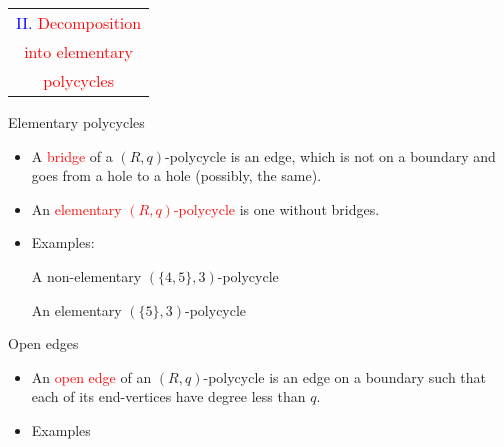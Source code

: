 \documentclass[%
pdf,
colorBG,
slideColor,
]{prosper}
\begin{document}
\begin{slide}{}
\begin{center}
{\Huge 
\begin{tabular*}{8cm}{c}
\\[-0.5cm]
\textcolor{blue}{II. }\textcolor{red}{Decomposition}\\
\textcolor{red}{into elementary}\\
\textcolor{red}{polycycles}
\end{tabular*}
}
\end{center}
\end{slide}



\begin{slide}{Elementary polycycles}
\begin{itemize}
\item A \textcolor{red}{bridge} of a $(R,q)$-polycycle is an edge,
which is not on a boundary and goes from a hole to a hole (possibly,
the same).
\item An \textcolor{red}{elementary $(R,q)$-polycycle} is one without bridges.
\item Examples:
\begin{center}
\begin{minipage}[b]{5.0cm}
\centering
{}\par
A non-elementary $(\{4,5\},3)$-polycycle
\end{minipage}
\begin{minipage}[b]{5.0cm}
\centering
{}\par
An elementary $(\{5\},3)$-polycycle
\end{minipage}
\end{center}

\end{itemize}
\end{slide}


\begin{slide}{Open edges}
\begin{itemize}
\item An \textcolor{red}{open edge} of an $(R,q)$-polycycle is an edge on a boundary such that each of its end-vertices have degree less than $q$.
\item Examples
\begin{center}
\begin{minipage}[b]{5.0cm}
\centering
{}\par
\end{minipage}
\begin{minipage}[b]{5.0cm}
\centering
{}\par
\end{minipage}
\end{center}


\end{itemize}
\end{slide}
\end{document}
